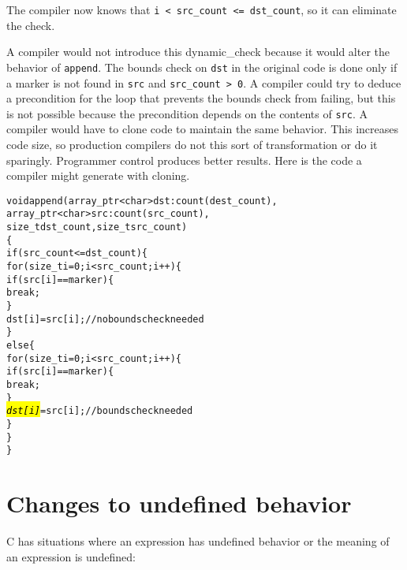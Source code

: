 The compiler now knows that \texttt{i < src\_count
<= dst\_count}, so it can eliminate the check.

A compiler would not introduce this dynamic\_check because it would
alter the behavior of \texttt{append}. The bounds check on \texttt{dst}
in the original code is done only if a marker is not found in
\texttt{src} and \texttt{src\_count \textgreater{} 0}. A compiler could
try to deduce a precondition for the loop 
that prevents the bounds check from failing, but this is
not possible because the precondition depends on the contents of
\texttt{src}. A compiler would have to clone code to maintain the same
behavior. This increases code size, so production compilers do not this
sort of transformation or do it sparingly. Programmer control produces
better results.   Here is the code a compiler might generate with cloning.

\begin{alltt}
void append(array\_ptr<char> dst: count(dest\_count), 
            array\_ptr<char> src : count(src\_count), 
            size\_t dst\_count, size_t src\_count)
\{ 
    if (src\_count <= dst\_count) \{
        for (size\_t i = 0; i < src\_count; i++) \{
            if (src[i] == marker) \{
                break;
            \}
            dst[i] = src[i];  // no bounds check needed
        \}   
    else \{
        for (size\_t i = 0; i < src\_count; i++) \{
            if (src[i] == marker) \{
                break;
            \}
            \hl{\textit{dst[i]}} = src[i];  // bounds check needed
        \}   
    \}
\}
\end{alltt}

\section{Changes to undefined behavior}
\label{section:changes-to-undefined-behavior}

C has situations where an expression has undefined behavior or the
meaning of an expression is undefined:


